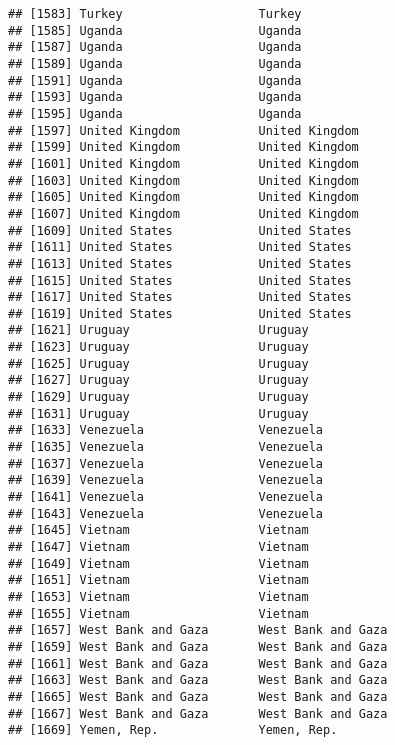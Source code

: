 \documentclass[]{article}
\begin{document}
\begin{verbatim}
## [1583] Turkey                   Turkey                  
## [1585] Uganda                   Uganda                  
## [1587] Uganda                   Uganda                  
## [1589] Uganda                   Uganda                  
## [1591] Uganda                   Uganda                  
## [1593] Uganda                   Uganda                  
## [1595] Uganda                   Uganda                  
## [1597] United Kingdom           United Kingdom          
## [1599] United Kingdom           United Kingdom          
## [1601] United Kingdom           United Kingdom          
## [1603] United Kingdom           United Kingdom          
## [1605] United Kingdom           United Kingdom          
## [1607] United Kingdom           United Kingdom          
## [1609] United States            United States           
## [1611] United States            United States           
## [1613] United States            United States           
## [1615] United States            United States           
## [1617] United States            United States           
## [1619] United States            United States           
## [1621] Uruguay                  Uruguay                 
## [1623] Uruguay                  Uruguay                 
## [1625] Uruguay                  Uruguay                 
## [1627] Uruguay                  Uruguay                 
## [1629] Uruguay                  Uruguay                 
## [1631] Uruguay                  Uruguay                 
## [1633] Venezuela                Venezuela               
## [1635] Venezuela                Venezuela               
## [1637] Venezuela                Venezuela               
## [1639] Venezuela                Venezuela               
## [1641] Venezuela                Venezuela               
## [1643] Venezuela                Venezuela               
## [1645] Vietnam                  Vietnam                 
## [1647] Vietnam                  Vietnam                 
## [1649] Vietnam                  Vietnam                 
## [1651] Vietnam                  Vietnam                 
## [1653] Vietnam                  Vietnam                 
## [1655] Vietnam                  Vietnam                 
## [1657] West Bank and Gaza       West Bank and Gaza      
## [1659] West Bank and Gaza       West Bank and Gaza      
## [1661] West Bank and Gaza       West Bank and Gaza      
## [1663] West Bank and Gaza       West Bank and Gaza      
## [1665] West Bank and Gaza       West Bank and Gaza      
## [1667] West Bank and Gaza       West Bank and Gaza      
## [1669] Yemen, Rep.              Yemen, Rep.             

\end{verbatim}
\end{document}
